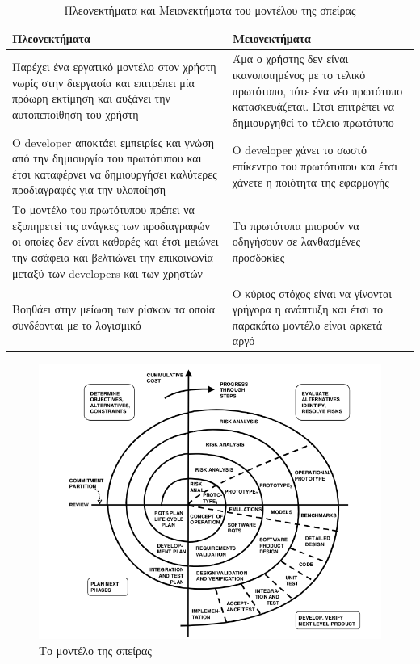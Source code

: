 \begin{table}[H]
  \centering
  \begin{tabular}{| p{8cm} | p{8cm} |}
    \hline
    \textbf{Πλεονεκτήματα} & \textbf{Μειονεκτήματα} \\
    \hline
    Παρέχει ένα εργατικό μοντέλο στον χρήστη νωρίς στην διεργασία και επιτρέπει μία πρόωρη εκτίμηση και αυξάνει την αυτοπεποίθηση του χρήστη & Άμα ο χρήστης δεν είναι ικανοποιημένος με το τελικό πρωτότυπο, τότε ένα νέο πρωτότυπο κατασκευάζεται. Έτσι επιτρέπει να δημιουργηθεί το τέλειο πρωτότυπο \\
    \hline
    Ο developer αποκτάει εμπειρίες και γνώση από την δημιουργία του πρωτότυπου και έτσι καταφέρνει να δημιουργήσει καλύτερες προδιαγραφές για την υλοποίηση & Ο developer χάνει το σωστό επίκεντρο του πρωτότυπου και έτσι χάνετε η ποιότητα της εφαρμογής \\
    \hline
    Το μοντέλο του πρωτότυπου πρέπει να εξυπηρετεί τις ανάγκες των προδιαγραφών οι οποίες δεν είναι καθαρές και έτσι μειώνει την ασάφεια και βελτιώνει την επικοινωνία μεταξύ των developers και των χρηστών & Τα πρωτότυπα μπορούν να οδηγήσουν σε λανθασμένες προσδοκίες \\
    \hline
    Βοηθάει στην μείωση των ρίσκων τα οποία συνδέονται με το λογισμικό & Ο κύριος στόχος είναι να γίνονται γρήγορα η ανάπτυξη και έτσι το παρακάτω μοντέλο είναι αρκετά αργό \\
    \hline
  \end{tabular}
  \caption{Πλεονεκτήματα και Μειονεκτήματα του μοντέλου της σπείρας}
  \label{tab:spiral}
\end{table}

\begin{figure}[H]
  \centering
  \includegraphics[width=150mm]{Figures/spiral.png}
  \caption[Το μοντέλο της σπείρας]{Το μοντέλο της σπείρας}
  \label{fig:spiral}
\end{figure}

